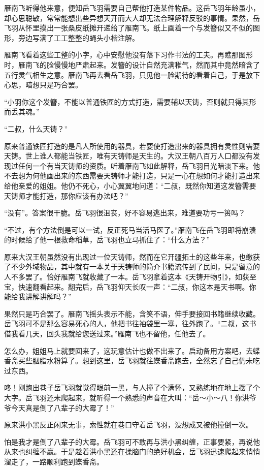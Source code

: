 雁南飞听得他来意，便知岳飞羽需要自己帮他打造某件物品。这岳飞羽年龄虽小，却心思聪敏，常常能想出些异想天开而大人却无法合理解释反驳的事情。果然，岳飞羽从怀里摸出一张桑皮纸摊开递给了雁南飞。纸上画着一个与发簪似又不似的图形，旁边写满了工工整整的蝇头小楷注解。

雁南飞看着这些工整的小字，心中安慰他没有落下习作书法的工夫。再瞧那图形时，雁南飞的脸慢慢地严肃起来。发簪的设计自然充满稚气，然而其中竟然暗含了五行灵气相生之意。雁南飞再去看岳飞羽，只见他一脸期待的看着自己，于是放下心思，暗想只是巧合罢。

“小羽你这个发簪，不能以普通铁匠的方式打造，需要辅以天铸，否则就只得其形而丢其魂。”

“二叔，什么天铸？”

原来普通铁匠打造的是凡人所使用的器具，若要使打造出来的器具拥有灵性则需要天铸。世上谁人都能当铁匠，唯有天铸师是天生的。大汉王朝八百万人口都没有发现过任何一个有当天铸师的资质。听着雁南飞如此解释，岳飞羽目光暗淡下来。他不去想为何他画出来的东西需要天铸师才能打造，只是一心在想如何才能打造出来给他亲爱的姐姐。他仍不死心，小心翼翼地问道：“二叔，既然你知道这发簪需要天铸师才能打造，那你应该有办法吧？”

“没有”。答案很干脆。岳飞羽很沮丧，好不容易逃出来，难道要功亏一篑吗？

“不过，有个方法倒是可以一试，反正死马当活马医了。”雁南飞在岳飞羽即将崩溃的时候给了他一根救命稻草，岳飞羽也立马抓住了：“什么方法？”

原来大汉王朝虽然没有出现过一位天铸师，然而在它开疆拓土的这些年来，也缴获了不少外域物品，其中就有一本关于天铸师的简介书籍流传到了民间，只是留意的人不多罢了。恰好雁南飞就收藏了一本。岳飞羽拿着这本《天铸开物引》，如获至宝，快速翻看起来。翻完后，岳飞羽仰天长叹一声：“二叔，你这本是天书啊。你能给我讲解讲解吗？”

果然只是巧合罢了。雁南飞摇头表示不能，含笑不语，伸手要接回书籍继续收藏。岳飞羽可不是那么容易死心的人，他把书往袖袋里一塞，往外跑了。“二叔，这书借我看几天，回头我就给您送过来。”雁南飞也不留他，任他去了。

怎么办，姐姐马上就要回来了，这玩意估计也做不出来了。启动备用方案吧，去蝶香斋买些胭脂水粉算了。想到这里，岳飞羽就往蝶香斋跑去，全然忘了自己仍未吃过东西。

咚！刚跑出巷子岳飞羽就觉得眼前一黑，与人撞了个满怀，又熟练地在地上摆了个大字。岳飞羽还未爬起来，就听得一个熟悉的声音在大叫：“岳～小～八！你洪爷爷今天真是倒了八辈子的大霉了！”

原来洪小黑反正闲来无事，索性就在巷口守着岳飞羽，没想成又被他撞倒一次。

怕是我才是倒了八辈子的大霉。岳飞羽可不敢再与洪小黑纠缠，正事要紧，再说他从来也纠缠不赢。于是趁着洪小黑还在揉脑门的绝好机会，岳飞羽迅速爬起来悄悄溜走了，一路顺利跑到蝶香斋。

